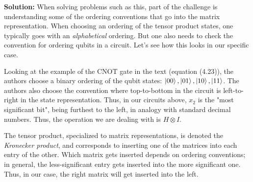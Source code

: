 \documentclass{book}
\begin{document}
    \textbf{Solution:} When solving problems such as this, part of the challenge is understanding some of the ordering conventions that go into the matrix representation. When choosing an ordering of the tensor product states, one typically goes with an \emph{alphabetical} ordering. But one also needs to check the convention for ordering qubits in a circuit. Let's see how this looks in our specific case.

    Looking at the example of the $\mathrm{CNOT}$ gate in the text (equation (4.23)), the authors choose a binary ordering of the qubit states: $\ket{00}, \ket{01}, \ket{10}, \ket{11}$. The authors also choose the convention where top-to-bottom in the circuit is left-to-right in the state representation. Thus, in our circuits above, $x_2$ is the "most significant bit", being furthest to the left, in analogy with standard decimal numbers. Thus, the operation we are dealing with is $H \otimes I$.

    The tensor product, specialized to matrix representations, is denoted the \emph{Kronecker product}, and corresponds to inserting one of the matrices into each entry of the other. Which matrix gets inserted depends on ordering conventions; in general, the less-significant entry gets inserted into the more significant one. Thus, in our case, the right matrix will get inserted into the left.
\end{document}
